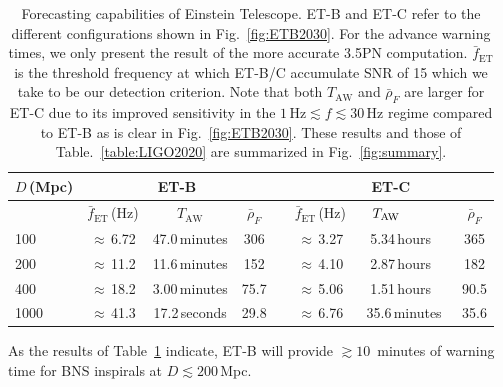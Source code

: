 \documentclass[prd,amsmath,amssymb,aps,floats,amsfonts,notitlepage,superscriptaddress,eqsecnum,nofootinbib,10pt]{revtex4-1}
\newcommand\T{\rule{0pt}{2.6ex}}       %
\newcommand\B{\rule[-1.2ex]{0pt}{0pt}} %
\begin{document}
\begin{table}[h]
\centering
\begin{tabular}{lccccccc}
\hline\hline
$D\,$(Mpc) & \multicolumn{3}{c}{ET-B} &  & \multicolumn{3}{c}{ET-C}\T\B\\
\hline
{}& $\bar{f}_\text{ET}\,$(Hz) & \ \hspace{7mm} $T_\text{AW}$ \ \hspace{7mm} & $\bar{\rho}_{F}$ &{} & $\bar{f}_\text{ET}\,$(Hz) & \ \hspace{5mm} $T_\text{AW}\hspace{12mm}$& $\bar{\rho}_{F}$\T\B\\
100 & $\approx\,$6.72 &  47.0\,minutes & 306 &{\qquad} & $\approx\,$3.27 & 5.34\,hours\ & 365\T\\
200 & $\approx\,$11.2 & 11.6\,minutes & 152 &{\qquad} & $\approx\,$4.10 & 2.87\,hours\ & 182 \\
400 & $\approx\,$18.2 & 3.00\,minutes & 75.7 &{\qquad} & $\approx\,$5.06 & 1.51\,hours\ & 90.5\\
1000 & $\approx\,$41.3 &17.2\,seconds & 29.8& \qquad &    $\approx\,$6.76 & 35.6\,minutes & 35.6  \\
\hline\hline
\end{tabular}
\caption{Forecasting capabilities of Einstein Telescope. 
ET-B and ET-C refer to the different configurations shown in Fig.~\ref{fig:ETB2030}. For the advance warning times, we only present the result of the more accurate 3.5PN computation. $\bar{f}_\text{ET}$ is the threshold frequency at which
ET-B/C accumulate SNR of 15 which we take to be our detection criterion. Note that both $T_\text{AW}$ and $\bar\rho_F$ are larger for ET-C
due to its improved sensitivity in the $1\,\text{Hz}\lesssim f\lesssim 30\,$Hz regime compared to ET-B as is clear in Fig.~\ref{fig:ETB2030}.
These results and those of Table.~\ref{table:LIGO2020} are summarized in Fig.~\ref{fig:summary}.}\label{table:ET}
\end{table}
%
%
As the results of Table~\ref{table:ET} indicate, ET-B will provide $\gtrsim 10\,$ minutes of warning time for BNS inspirals at $D\lesssim 200\,$Mpc.
\end{document}
